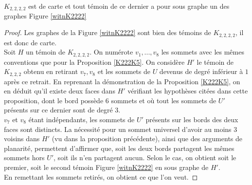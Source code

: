 \documentclass{scrartcl}
\begin{document}
\begin{flushleft}
\begin{lem}\label{formeK2222}
    $K_{2,2,2,2}$ est de carte et tout témoin de ce dernier a pour sous graphe un des graphes Figure \ref{witnK2222}
\end{lem}

\begin{proof}
    Les graphes de la Figure \ref{witnK2222} sont bien des témoins de $K_{2,2,2,2}$, il est donc de carte.\\
    Soit $H$ un témoin de $K_{2,2,2,2}$. On numérote $v_1, ..., v_8$ les sommets avec les mêmes conventions que pour la Proposition
    \ref{K222K5}. On considère $H'$ le témoin de $K_{2,2,2}$ obtenu en retirant $v_7, v_8$ et les sommets de $U$ devenus
    de degré inférieur à $1$ après ce retrait. En reprenant la démonstration de la Proposition \ref{K222K5}, on en déduit
    qu'il existe deux faces dans $H'$ vérifiant les hypothèses citées dans cette proposition, dont le bord possède $6$
    sommets et où tout les sommets de $U'$ présents sur ce dernier sont de degré $3$.\\
    $v_7$ et $v_8$ étant indépendants, les sommets de $U'$ présents sur les bords des deux faces sont distincts. La nécessité
    pour un sommet universel d'avoir au moins $3$ voisins dans $H'$ (vu dans la proposition précédente), ainsi que des
    arguments de planarité, permettent d'affirmer que, soit les deux bords partagent les mêmes sommets hors $U'$, soit
    ils n'en partagent aucun. Selon le cas, on obtient soit le premier, soit le second témoin Figure \ref{witnK2222} en sous graphe de $H'$.\\
    En remettant les sommets retirés, on obtient ce que l'on veut.
\end{proof}


\end{flushleft}
\end{document}
